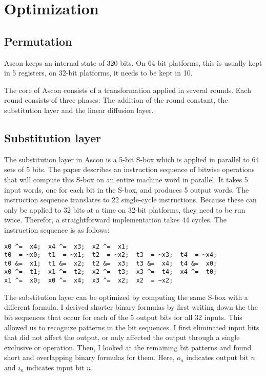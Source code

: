 \section{Optimization}

\subsection{Permutation}

Ascon keeps an internal state of 320 bits. On 64-bit platforms, this is usually
kept in 5 registers, on 32-bit platforms, it needs to be kept in 10.

The core of Ascon consists of a transformation applied in several rounds. Each
round consists of three phases: The addition of the round constant, the
substitution layer and the linear diffusion layer.

\subsection{Substitution layer}

The substitution layer in Ascon is a 5-bit S-box which is applied in parallel to
64 sets of 5 bits. The paper describes an instruction sequence of bitwise
operations that will compute this S-box on an entire machine word in parallel.
It takes 5 input words, one for each bit in the S-box, and produces 5 output
words. The instruction sequence translates to 22 single-cycle instructions.
Because these can only be applied to 32 bits at a time on 32-bit platforms, they
need to be run twice. Therefor, a straightforward implementation takes 44
cycles. The instruction sequence is as follows:

\begin{samepage}
\begin{verbatim}
x0 ^=  x4;  x4 ^=  x3;  x2 ^=  x1;
t0  = ~x0;  t1  = ~x1;  t2  = ~x2;  t3  = ~x3;  t4  = ~x4;
t0 &=  x1;  t1 &=  x2;  t2 &=  x3;  t3 &=  x4;  t4 &=  x0;
x0 ^=  t1;  x1 ^=  t2;  x2 ^=  t3;  x3 ^=  t4;  x4 ^=  t0;
x1 ^=  x0;  x0 ^=  x4;  x3 ^=  x2;  x2  = ~x2;
\end{verbatim}
\end{samepage}

The substitution layer can be optimized by computing the same S-box with a
different formula. I derived shorter binary formulas by first writing down the
the bit sequences that occur for each of the 5 output bits for all 32 inputs.
This allowed us to recognize patterns in the bit sequences. I first eliminated
input bits that did not affect the output, or only affected the output through a
single exclusive or operation. Then, I looked at the remaining bit patterns and
found short and overlapping binary formulas for them. Here, $o_n$ indicates
output bit $n$ and $i_n$ indicates input bit $n$.

